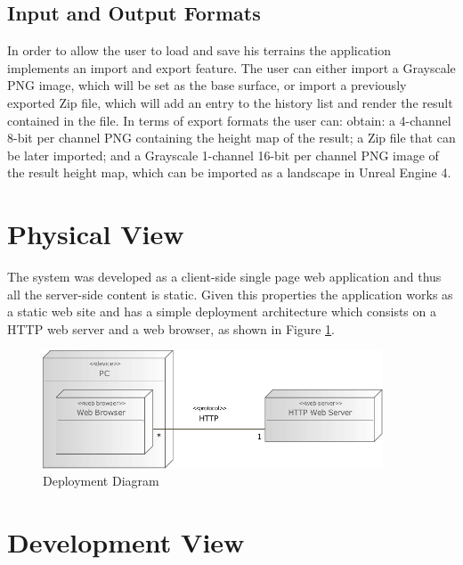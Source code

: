     \subsection {Input and Output Formats} \label{sec:io_formats}
    
      In order to allow the user to load and save his terrains the application implements an import and export feature. The user can either import a Grayscale PNG image, which will be set as the base surface, or import a previously exported Zip file, which will add an entry to the history list and render the result contained in the file. In terms of export formats the user can: obtain: a 4-channel 8-bit per channel PNG containing the height map of the result; a Zip file that can be later imported; and a Grayscale 1-channel 16-bit per channel PNG image of the result height map, which can be imported as a landscape in Unreal Engine 4.

  \section {Physical View} %
    
    The system was developed as a client-side single page web application and thus all the server-side content is static. Given this properties the application works as a static web site and has a simple deployment architecture which consists on a HTTP web server and a web browser, as shown in Figure \ref{fig:deployment_diagram}.
    
    \begin{figure}[h!]
    	\begin{center}
    		\includegraphics[width=0.9\textwidth]{images/diagrams/deployment.pdf}
    	\end{center}
    	\caption{Deployment Diagram}
    	\label{fig:deployment_diagram}
    \end{figure}
    
  \section {Development View} %
    

